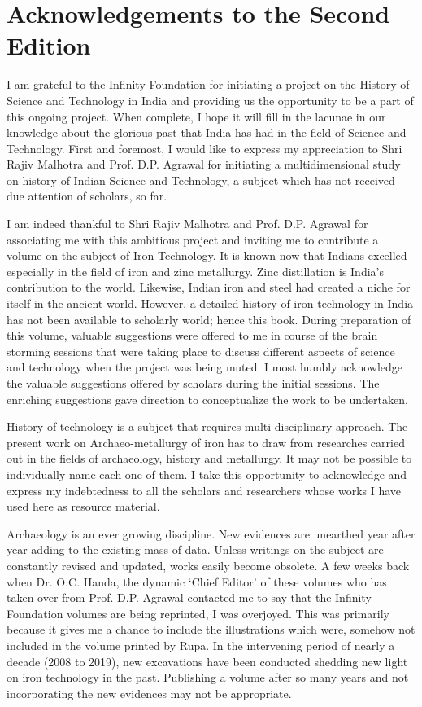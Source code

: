 
\chapter*{Acknowledgements to the Second Edition}

I am grateful to the Infinity Foundation for initiating a project on the History of Science and Technology in India and providing us the opportunity to be a part of this ongoing project. When complete, I hope it will fill in the lacunae in our knowledge about the glorious past that India has had in the field of Science and Technology. First and foremost, I would like to express my appreciation to Shri Rajiv Malhotra and Prof. D.P. Agrawal for initiating a multidimensional study on history of Indian Science and Technology, a subject which has not received due attention of scholars, so far.

I am indeed thankful to Shri Rajiv Malhotra and Prof. D.P. Agrawal for associating me with this ambitious project and inviting me to contribute a volume on the subject of Iron Technology. It is known now that Indians excelled especially in the field of iron and zinc metallurgy. Zinc distillation is India's contribution to the world. Likewise, Indian iron and steel had created a niche for itself in the ancient world. However, a detailed history of iron technology in India has not been available to scholarly world; hence this book. During preparation of this volume, valuable suggestions were offered to me in course of the brain storming sessions that were taking place to discuss different aspects of science and technology when the project was being muted. I most humbly acknowledge the valuable suggestions offered by scholars during the initial sessions. The enriching suggestions gave direction to conceptualize the work to be undertaken.

History of technology is a subject that requires multi-disciplinary approach. The present work on Archaeo-metallurgy of iron has to draw from researches carried out in the fields of archaeology, history and metallurgy. It may not be possible to individually name each one of them. I take this opportunity to acknowledge and express my indebtedness to all the scholars and researchers whose works I have used here as resource material.

Archaeology is an ever growing discipline. New evidences are unearthed year after year adding to the existing mass of data. Unless writings on the subject are constantly revised and updated, works easily become obsolete. A few weeks back when Dr. O.C. Handa, the dynamic `Chief Editor' of these volumes who has taken over from Prof. D.P. Agrawal contacted me to say that the Infinity Foundation volumes are being reprinted, I was overjoyed. This was primarily because it gives me a chance to include the illustrations which were, somehow not included in the volume printed by Rupa. In the intervening period of nearly a decade (2008 to 2019), new excavations have been conducted shedding new light on iron technology in the past. Publishing a volume after so many years and not incorporating the new evidences may not be appropriate.

